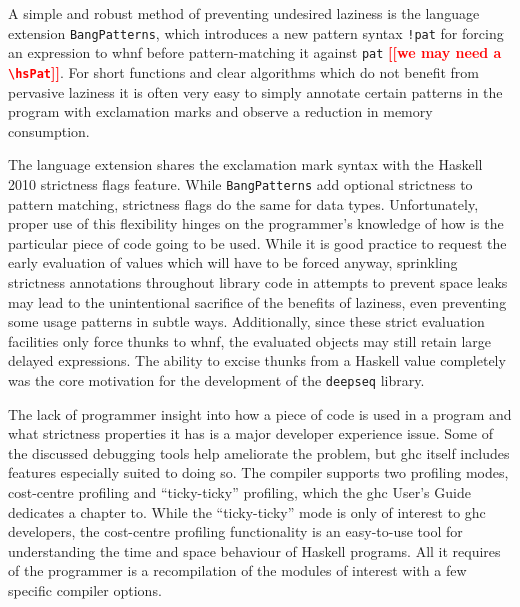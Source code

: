 \documentclass[thesis=B,english]{FITthesis}[2019/12/23]
\newcommand{\todo}[1]{\textcolor{red}{\textbf{[[#1]]}}}
\newcommand{\hackage}[1]{\texttt{#1}}
\newcommand{\hsIdent}[1]{\texttt{#1}}
\newcommand{\hsCode}[1]{\texttt{#1}}
\begin{document}
A simple and robust method of preventing undesired laziness is the
language extension \texttt{BangPatterns}, which introduces a new pattern syntax
\hsCode{!pat} for forcing an expression to \acrshort{whnf} before
pattern-matching it against \hsIdent{pat} \todo{we may need a
\texttt{\textbackslash hsPat}}. For short functions and clear algorithms which
do not benefit from pervasive laziness it is often very easy to simply annotate
certain patterns in the program with exclamation marks and observe a reduction
in memory consumption.

The language extension shares the exclamation mark syntax with the Haskell 2010
strictness flags feature\cite{haskell2010-strictness-flags}. While
\texttt{BangPatterns} add optional strictness to pattern matching, strictness
flags do the same for data types. Unfortunately, proper use of this flexibility
hinges on the programmer's knowledge of how is the particular piece of code
going to be used. While it is good practice to request the early evaluation of
values which will have to be forced anyway, sprinkling strictness annotations
throughout library code in attempts to prevent space leaks may lead to the
unintentional sacrifice of the benefits of laziness, even preventing some usage
patterns in subtle ways. Additionally, since these strict evaluation facilities
only force thunks to \acrshort{whnf}, the evaluated objects may still retain
large delayed expressions. The ability to excise thunks from a Haskell value
completely was the core motivation for the development of the \hackage{deepseq}
library.

The lack of programmer insight into how a piece of code is used in a program
and what strictness properties it has is a major developer experience
issue\cite{memory-profiling-blog-post, anatomy-of-thunk-leak-blog-post,
nothunks-blog-post, haskell-space-leaks, detecting-space-leaks-blog-post}.
Some of the discussed debugging tools help ameliorate the problem, but
\acrshort{ghc} itself includes features especially suited to doing so. The
compiler supports two profiling modes, cost-centre profiling and
``ticky-ticky'' profiling, which the \acrshort{ghc} User's Guide dedicates a
chapter to\cite{ghc-profiling}. While the ``ticky-ticky'' mode is only of
interest to \acrshort{ghc} developers, the cost-centre profiling functionality
is an easy-to-use tool for understanding the time and space behaviour of
Haskell programs. All it requires of the programmer is a recompilation of the
modules of interest with a few specific compiler options.
\end{document}
